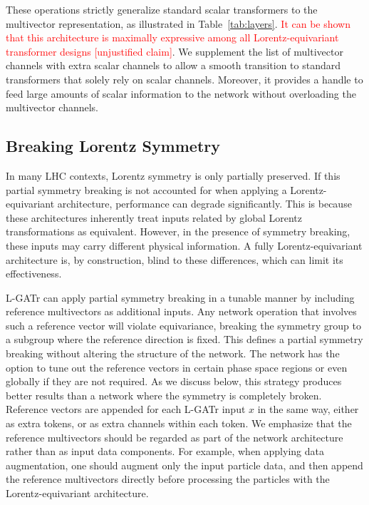 \documentclass[submission, Phys]{SciPost}
\begin{document}
These operations strictly generalize standard scalar transformers to the multivector representation, as illustrated in Table~\ref{tab:layers}. \textcolor{red}{It can be shown that this architecture is maximally expressive among all Lorentz-equivariant transformer designs [unjustified claim]}. We supplement the list of multivector channels with extra scalar channels to allow a smooth transition to standard transformers that solely rely on scalar channels. Moreover, it provides a handle to feed large amounts of scalar information to the network without overloading the multivector channels.

\subsection{Breaking Lorentz Symmetry}
\label{sec:symmetrybreaking}

In many LHC contexts, Lorentz symmetry is only partially preserved. If this partial symmetry breaking is not accounted for when applying a Lorentz-equivariant architecture, performance can degrade significantly. This is because these architectures inherently treat inputs related by global Lorentz transformations as equivalent. However, in the presence of symmetry breaking, these inputs may carry different physical information. A fully Lorentz-equivariant architecture is, by construction, blind to these differences, which can limit its effectiveness.

L-GATr can apply partial symmetry breaking in a tunable manner by including reference multivectors as additional inputs. 
Any network operation that involves such a reference vector will violate equivariance, breaking the symmetry group to a subgroup where the reference direction is fixed. This defines a partial symmetry breaking without altering the structure of the network. The network has the option to tune out the reference vectors in certain phase space regions or even globally if they are not required. As we discuss below, this strategy produces better results than a network where the symmetry is completely broken. Reference vectors are appended for each L-GATr input $x$ in the same way, either as extra tokens, or as extra channels within each token. We emphasize that the reference multivectors should be regarded as part of the network architecture rather than as input data components. For example, when applying data augmentation, one should augment only the input particle data, and then append the reference multivectors directly before processing the particles with the Lorentz-equivariant architecture.
\end{document}
